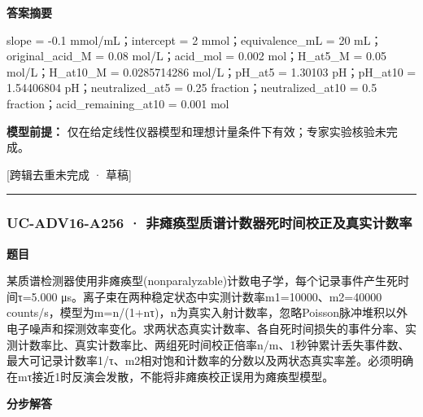 \documentclass[UTF8,11pt,a4paper]{ctexart}
\begin{document}
\noindent\textbf{答案摘要}\par
slope = -0.1 mmol/mL；intercept = 2 mmol；equivalence\_mL = 20 mL；original\_acid\_M = 0.08 mol/L；acid\_mol = 0.002 mol；H\_at5\_M = 0.05 mol/L；H\_at10\_M = 0.0285714286 mol/L；pH\_at5 = 1.30103 pH；pH\_at10 = 1.54406804 pH；neutralized\_at5 = 0.25 fraction；neutralized\_at10 = 0.5 fraction；acid\_remaining\_at10 = 0.001 mol\par
\noindent\textbf{模型前提：}
仅在给定线性仪器模型和理想计量条件下有效；专家实验核验未完成。\par
\noindent\textcolor{red!65!black}{[跨辑去重未完成 · 草稿]} \par
\medskip\hrule\medskip
{}
\subsubsection*{UC-ADV16-A256 · 非瘫痪型质谱计数器死时间校正及真实计数率}
\noindent\textbf{题目}\par
某质谱检测器使用非瘫痪型(nonparalyzable)计数电子学，每个记录事件产生死时间τ=5.000 μs。离子束在两种稳定状态中实测计数率m1=10000、m2=40000 counts/s，模型为m=n/(1+nτ)，n为真实入射计数率，忽略Poisson脉冲堆积以外电子噪声和探测效率变化。求两状态真实计数率、各自死时间损失的事件分率、实测计数率比、真实计数率比、两组死时间校正倍率n/m、1秒钟累计丢失事件数、最大可记录计数率1/τ、m2相对饱和计数率的分数以及两状态真实率差。必须明确在mτ接近1时反演会发散，不能将非瘫痪校正误用为瘫痪型模型。\par
\medskip\noindent\textbf{分步解答}
\end{document}
